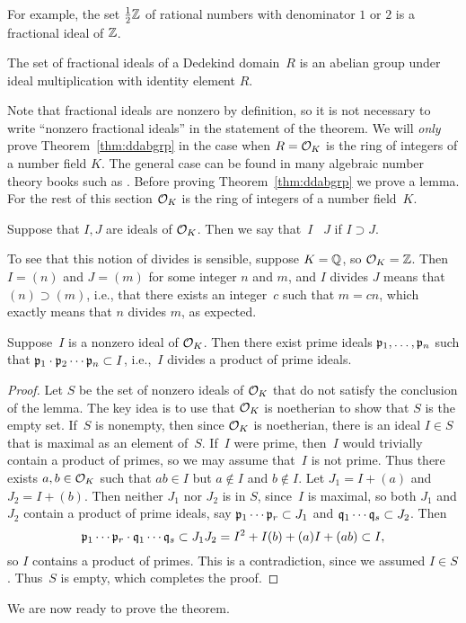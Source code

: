 For example, the set $\frac{1}{2}\mathbb{Z}$ of rational numbers with
denominator $1$ or $2$ is a fractional ideal of $\mathbb{Z}$.

\begin{theorem}\label{thm:ddabgrp}
The set of fractional ideals of a Dedekind domain~$R$ is an
abelian group under ideal multiplication with identity element $R$.
\end{theorem}
Note that fractional ideals are nonzero by definition, so it is not
necessary to write ``nonzero fractional ideals'' in the statement of
the theorem. We will {\em only} prove Theorem~\ref{thm:ddabgrp} in the
case when $R=\mathcal{O}_K$ is the ring of integers of a number field $K$. The
general case can be found in many algebraic number theory books such
as \cite[Ch.~3]{marcus1977number}.
Before proving Theorem~\ref{thm:ddabgrp} we prove a lemma.  For the
rest of this section $\mathcal{O}_K$ is the ring of integers of a number
field~$K$.


\begin{definition}
Suppose that $I,J$ are ideals of $\mathcal{O}_K$.
Then we say that~$I$ ~$J$ if $I\supset J$.
\end{definition}
To see that this notion of divides is sensible, suppose $K=\mathbb{Q}$, so
$\mathcal{O}_K=\mathbb{Z}$.  Then $I=(n)$ and $J=(m)$ for some integer $n$ and $m$, and
$I$ divides $J$ means that $(n)\supset (m)$, i.e., that there exists
an integer~$c$ such that $m=cn$, which exactly means that $n$ divides
$m$, as expected.

\begin{lemma}\label{lem:divprod}
Suppose~$I$ is a nonzero ideal of $\mathcal{O}_K$.  Then there exist prime ideals
$\mathfrak{p}_1,\ldots, \mathfrak{p}_n$ such that $\mathfrak{p}_1\cdot \mathfrak{p}_2\cdots \mathfrak{p}_n \subset{}I$,
i.e.,~$I$ divides a product of prime ideals.
\end{lemma}
\begin{proof}
Let $S$ be the set of nonzero ideals of $\mathcal{O}_K$ that do not
satisfy the conclusion
of the lemma.  The key idea is to use that $\mathcal{O}_K$ is noetherian to show that
$S$ is the empty set.   If~$S$ is
nonempty, then since $\mathcal{O}_K$ is noetherian, there is an ideal
$I\in S$ that is maximal as an element of~$S$.  If~$I$ were prime, then~$I$
would trivially contain a product of primes, so we may assume that~$I$
is not prime.  Thus there exists $a,b\in \mathcal{O}_K$ such that $ab\in
I$ but $a\not\in I$ and $b\not\in I$.  Let $J_1 = I+(a)$ and
$J_2=I+(b)$.  Then neither $J_1$ nor $J_2$ is in $S$, since~$I$ is
maximal, so both $J_1$ and $J_2$ contain a product of prime ideals,
say $\mathfrak{p}_1 \cdots \mathfrak{p}_r \subset J_1$ and $\mathfrak{q}_1\cdots \mathfrak{q}_s \subset J_2$.
Then
$$
\mathfrak{p}_1  \cdots \mathfrak{p}_r \cdot \mathfrak{q}_1\cdots \mathfrak{q}_s \subset
J_1 J_2 = I^2 + I(b)+  (a)I+ (ab) \subset I,$$
so $I$ contains a product of primes.  This is a contradiction,
since we assumed $I\in S$.   Thus~$S$ is empty, which completes
the proof.
\end{proof}
We are now ready to prove the theorem.

